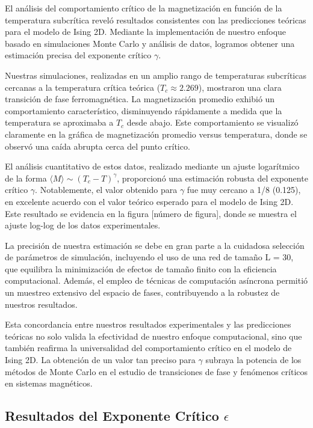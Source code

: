 \documentclass[twocolumn]{article}
\begin{document}
El análisis del comportamiento crítico de la magnetización en función de la temperatura subcrítica reveló resultados consistentes con las predicciones teóricas para el modelo de Ising 2D. Mediante la implementación de nuestro enfoque basado en simulaciones Monte Carlo y análisis de datos, logramos obtener una estimación precisa del exponente crítico $\gamma$.

Nuestras simulaciones, realizadas en un amplio rango de temperaturas subcríticas cercanas a la temperatura crítica teórica ($T_c \approx 2.269$), mostraron una clara transición de fase ferromagnética. La magnetización promedio exhibió un comportamiento característico, disminuyendo rápidamente a medida que la temperatura se aproximaba a $T_c$ desde abajo. Este comportamiento se visualizó claramente en la gráfica de magnetización promedio versus temperatura, donde se observó una caída abrupta cerca del punto crítico.

El análisis cuantitativo de estos datos, realizado mediante un ajuste logarítmico de la forma $\langle M \rangle \sim (T_c - T)^\gamma$, proporcionó una estimación robusta del exponente crítico $\gamma$. Notablemente, el valor obtenido para $\gamma$ fue muy cercano a 1/8 (0.125), en excelente acuerdo con el valor teórico esperado para el modelo de Ising 2D. Este resultado se evidencia en la figura [número de figura], donde se muestra el ajuste log-log de los datos experimentales.

La precisión de nuestra estimación se debe en gran parte a la cuidadosa selección de parámetros de simulación, incluyendo el uso de una red de tamaño L = 30, que equilibra la minimización de efectos de tamaño finito con la eficiencia computacional. Además, el empleo de técnicas de computación asíncrona permitió un muestreo extensivo del espacio de fases, contribuyendo a la robustez de nuestros resultados.

Esta concordancia entre nuestros resultados experimentales y las predicciones teóricas no solo valida la efectividad de nuestro enfoque computacional, sino que también reafirma la universalidad del comportamiento crítico en el modelo de Ising 2D. La obtención de un valor tan preciso para $\gamma$ subraya la potencia de los métodos de Monte Carlo en el estudio de transiciones de fase y fenómenos críticos en sistemas magnéticos.

\subsection*{Resultados del Exponente Crítico $\epsilon$}
\end{document}

